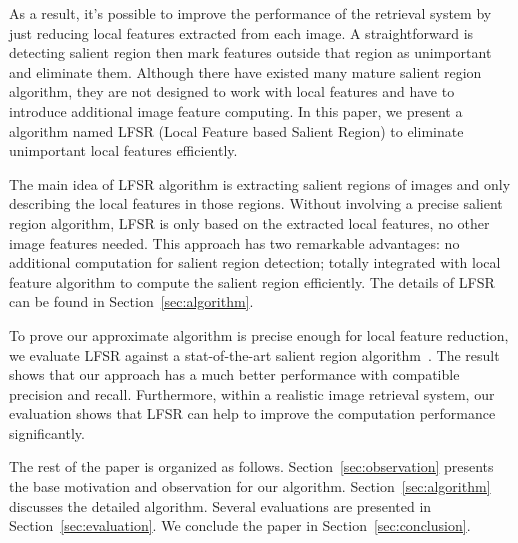 As a result, it's possible to improve the performance of the retrieval system by just reducing local features extracted from each image. A straightforward is detecting salient region then mark features outside that region as unimportant and eliminate them. Although there have existed many mature salient region algorithm, they are not designed to work with local features and have to introduce additional image feature computing. In this paper, we present a algorithm named LFSR (Local Feature based Salient Region) to eliminate unimportant local features efficiently.

The main idea of LFSR algorithm is extracting salient regions of images and only describing the local features in those regions. Without involving a precise salient region algorithm, LFSR is only based on the extracted local features, no other image features needed. This approach has two remarkable advantages: no additional computation for salient region detection; totally integrated with local feature algorithm to compute the salient region efficiently. The details of LFSR can be found in Section~\ref{sec:algorithm}. 

To prove our approximate algorithm is precise enough for local feature reduction, we evaluate LFSR against a stat-of-the-art salient region algorithm~\cite{achanta2009frequency}. The result shows that our approach has a much better performance with compatible precision and recall. Furthermore, within a realistic image retrieval system, our evaluation shows that LFSR can help to improve the computation performance significantly.

The rest of the paper is organized as follows. Section~\ref{sec:observation} presents the base motivation and observation for our algorithm. Section~\ref{sec:algorithm} discusses the detailed algorithm. Several evaluations are presented in Section~\ref{sec:evaluation}. We conclude the paper in Section~\ref{sec:conclusion}.